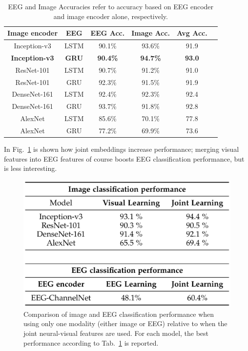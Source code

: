 \begin{table}[!ht]
    \centering
    \captionsetup{width=.8\linewidth}
    \begin{tabular}{cccccc}
    \hline
    \textbf{Image encoder} & \textbf{EEG} & \textbf{EEG Acc.} & \textbf{Image Acc.} & \textbf{Avg Acc.} \\
    \hline
    Inception-v3 & LSTM & 90.1\% & 93.6\% & 91.9 \\
    \textbf{Inception-v3} & \textbf{GRU} & \textbf{90.4\%} & \textbf{94.7\%} & \textbf{93.0} \\
    \hline
    ResNet-101 & LSTM & 90.7\% & 91.2\% & 91.0 \\
    ResNet-101 & GRU & 92.3\% & 91.5\% & 91.9 \\
    \hline
    DenseNet-161 & LSTM & 92.4\% & 92.3\% & 92.4 \\
    DenseNet-161 & GRU & 93.7\% & 91.8\% & 92.8 \\
    \hline
    AlexNet & LSTM & 85.6\% & 70.1\% & 77.8 \\
    AlexNet & GRU & 77.2\% & 69.9\% & 73.6 \\
    \hline
    \end{tabular}
    \caption{EEG and Image Accuracies refer to accuracy based on EEG encoder and image encoder alone, respectively.}
    \label{tab:palazzo}
\end{table}

In Fig.~\ref{fig:palazzo_2} is shown how joint embeddings increase performance; merging visual features into EEG features of course boosts EEG classification performance, but is less interesting.\\

\begin{figure}[!ht]
    \centering
    \captionsetup{width=.8\linewidth}
    \includegraphics[width=0.5\linewidth]{images/palazzo_2.png}
    \caption{Comparison of image and EEG classification performance when using only one modality (either image or EEG) relative to when the joint neural-visual features are used. For each model, the best performance according to Tab.~\ref{tab:palazzo} is reported.}
    \label{fig:palazzo_2}
\end{figure}

